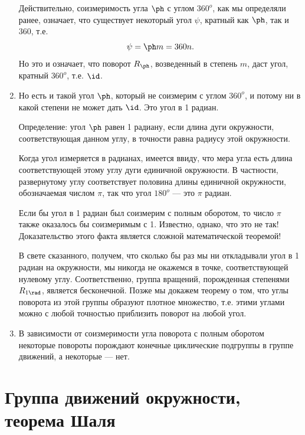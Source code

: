 \begin{enumerate}
Действительно, соизмеримость угла $\ph$ с углом $360^o$, как мы определяли ранее, означает, что существует некоторый угол $\psi$, кратный как $\ph$, так и $360$, т.е.
$$
\psi = \ph m = 360n.
$$
Но это и означает, что поворот $R_\ph$, возведенный в степень $m$, даст угол, кратный $360^o$, т.е. $\id$.

\item Но есть и такой угол $\ph$, который не соизмерим с углом $360^o$, и потому ни в какой степени не может дать $\id$. Это угол в 1 радиан.

Определение: угол $\ph$ равен 1 радиану, если длина дуги окружности, соответствующая данном углу, в точности равна радиусу этой окружности.

Когда угол измеряется в радианах, имеется ввиду, что мера угла есть длина соответствующей этому углу дуги единичной окружности. В частности, развернутому углу соответствует половина длины единичной окружности, обозначаемая числом $\pi$, так что угол $180^o$ --- это $\pi$ радиан.

Если бы угол в 1 радиан был соизмерим с полным оборотом, то число $\pi$ также оказалось бы соизмеримым с 1. Известно, однако, что это не так! Доказательство этого факта является сложной математической теоремой!

В свете сказанного, получем, что сколько бы раз мы ни откладывали угол в 1 радиан на окружности, мы никогда не окажемся в точке, соответствующей нулевому углу. Соответственно, группа вращений, порожденная степенями $R_{1\rad}$, является бесконечной. Позже мы докажем теорему о том, что углы поворота из этой группы образуют плотное множество, т.е. этими углами можно с любой точностью приблизить поворот на любой угол.

\item В зависимости от соизмеримости угла поворота с полным оборотом некоторые повороты порождают конечные циклические подгруппы в группе движений, а некоторые --- нет.
\end{enumerate}


\section{Группа движений окружности, теорема Шаля}


